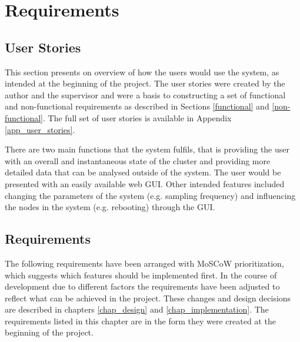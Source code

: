 \documentclass{l4proj}
\begin{document}
\chapter{Requirements}

\section{User Stories}
This section presents on overview of how the users would use the system, as intended at the beginning of the project. The user stories were created by the author and the supervisor and were a basis to constructing a set of functional and non-functional requirements as described in Sections \ref{functional} and \ref{non-functional}. The full set of user stories is available in Appendix \ref{app_user_stories}.

\noindent
There are two main functions that the system fulfils, that is providing the user with an overall and instantaneous state of the cluster and providing more detailed data that can be analysed outside of the system. The user would be presented with an easily available web GUI. Other intended features included changing the parameters of the system (e.g. sampling frequency) and influencing the nodes in the system (e.g. rebooting) through the GUI.

\section{Requirements}
The following requirements have been arranged with MoSCoW prioritization, which suggests which features should be implemented first. In the course of development due to different factors the requirements have been adjusted to reflect what can be achieved in the project. These changes and design decisions are described in chapters \ref{chap_design} and \ref{chap_implementation}. The requirements listed in this chapter are in the form they were created at the beginning of the project.
\end{document}
